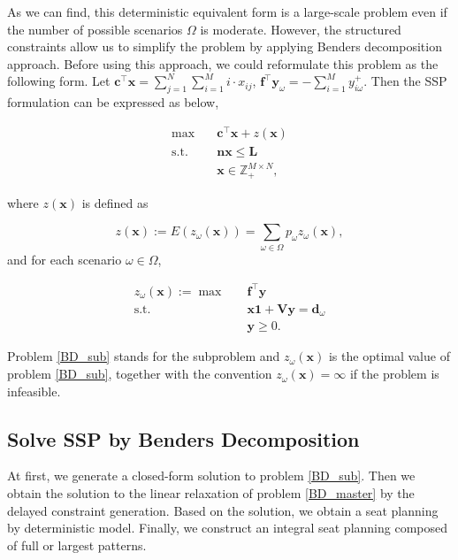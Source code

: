 As we can find, this deterministic equivalent form is a large-scale problem even if the number of possible scenarios $\Omega$ is moderate. However, the structured constraints allow us to simplify the problem by applying Benders decomposition approach. Before using this approach, we could reformulate this problem as the following form. Let $\mathbf{c}^{\intercal}\mathbf{x} = \sum_{j =1}^{N} \sum_{i=1}^M i \cdot x_{ij}$, $\mathbf{f}^{\intercal}\mathbf{y}_{\omega} = -\sum_{i=1}^{M} y_{i \omega}^{+}$. Then the SSP formulation can be expressed as below,

\begin{equation}\label{BD_master}
\begin{aligned}
\max \quad & \mathbf{c}^{\intercal} \mathbf{x}+ z(\mathbf{x}) \\
\text {s.t.} \quad & \mathbf{n} \mathbf{x} \leq \mathbf{L} \\
& \mathbf{x} \in \mathbb{Z}_{+}^{M \times N},
\end{aligned}
\end{equation}

where $z(\mathbf{x})$ is defined as 

$$z(\mathbf{x}) := E(z_{\omega}(\mathbf{x})) = \sum_{\omega \in \Omega} p_{\omega} z_{\omega}(\mathbf{x}),$$ and for each scenario $\omega \in \Omega$, 

\begin{equation}\label{BD_sub}
  \begin{aligned}
    z_{\omega}(\mathbf{x}) := \max \quad & \mathbf{f}^{\intercal} \mathbf{y} \\
    \text {s.t.} \quad & \mathbf{x} \mathbf{1} + \mathbf{V} \mathbf{y} = \mathbf{d}_{\omega} \\
     & \mathbf{y} \geq 0.
  \end{aligned}
\end{equation}

Problem \eqref{BD_sub} stands for the subproblem and $z_{\omega}(\mathbf{x})$ is the optimal value of problem \eqref{BD_sub}, together with the convention $z_{\omega}(\mathbf{x}) = \infty$ if the problem is infeasible.

\subsection{Solve SSP by Benders Decomposition}\label{solve_by_benders}
At first, we generate a closed-form solution to problem \eqref{BD_sub}. Then we obtain the solution to the linear relaxation of problem \eqref{BD_master} by the delayed constraint generation. Based on the solution, we obtain a seat planning by deterministic model. Finally, we construct an integral seat planning composed of full or largest patterns.

